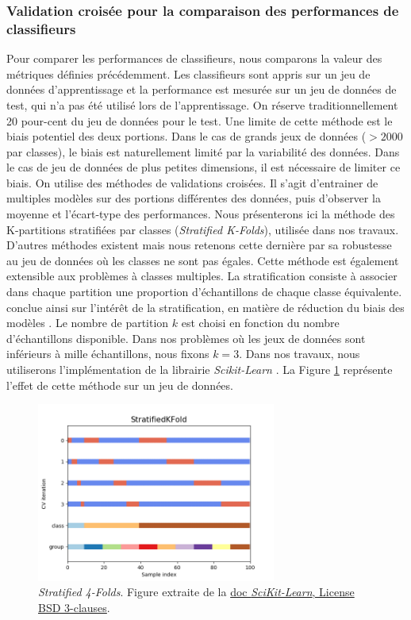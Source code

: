 \subsubsection{Validation croisée pour la comparaison des performances de classifieurs} \label{subsubsec:cross_val}
Pour comparer les performances de classifieurs, nous comparons la valeur des métriques définies précédemment.
Les classifieurs sont appris sur un jeu de données d'apprentissage et la performance est mesurée sur un jeu de données de test, qui n'a pas été utilisé lors de l'apprentissage.
On réserve traditionnellement 20 pour-cent du jeu de données pour le test.
Une limite de cette méthode est le biais potentiel des deux portions.
Dans le cas de grands jeux de données ($> 2 000$ par classes), le biais est naturellement limité par la variabilité des données.
Dans le cas de jeu de données de plus petites dimensions, il est nécessaire de limiter ce biais.
On utilise des méthodes de validations croisées.
Il s'agit d'entrainer de multiples modèles sur des portions différentes des données, puis d'observer la moyenne et l'écart-type des performances.
Nous présenterons ici la méthode des K-partitions stratifiées par classes (\textit{Stratified K-Folds}), utilisée dans nos travaux.
D'autres méthodes existent mais nous retenons cette dernière par sa robustesse au jeu de données où les classes ne sont pas égales.
Cette méthode est également extensible aux problèmes à classes multiples.
La stratification consiste à associer dans chaque partition une proportion d'échantillons de chaque classe équivalente.
\citeauthor{kohavi_study_1995} conclue ainsi sur l'intérêt de la stratification, en matière de réduction du biais des modèles \cite{kohavi_study_1995}.
Le nombre de partition $k$ est choisi en fonction du nombre d'échantillons disponible.
Dans nos problèmes où les jeux de données sont inférieurs à mille échantillons, nous fixons $k=3$.
Dans nos travaux, nous utiliserons l'implémentation de la librairie \textit{Scikit-Learn} \cite{pedregosa_scikit-learn_2011}.
La Figure \ref{fig:StratifiedKFold} représente l'effet de cette méthode sur un jeu de données.

\begin{figure}[hbtp]
    \centering
    \includegraphics[width=0.7\textwidth,height=0.7\textheight,keepaspectratio]{../Chap3/Figures/sphx_glr_plot_cv_indices_003.png}
    \caption{\emph{Stratified 4-Folds}. Figure extraite de la \href{https://scikit-learn.org/stable/auto_examples/model_selection/plot_cv_indices.html}{doc \textit{SciKit-Learn}, License BSD 3-clauses}.}
    \label{fig:StratifiedKFold}
\end{figure}

